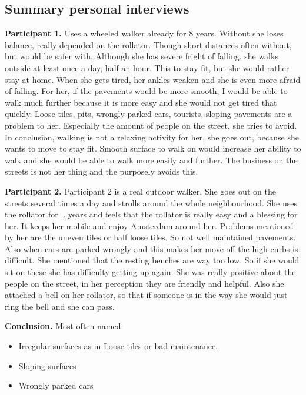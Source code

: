 



\subsection{Summary personal interviews}

\textbf{Participant 1.}
Uses a wheeled walker already for 8 years. Without she loses balance, really depended on the rollator. Though short distances often without, but would be safer with. Although she has severe fright of falling, she walks outside at least once a day, half an hour. This to stay fit, but she would rather stay at home. When she gets tired, her ankles weaken and she is even more afraid of falling. 
For her, if the pavements would be more smooth, I would be able to walk much further because it is more easy and she would not get tired that quickly. Loose tiles, pits, wrongly parked cars, tourists, sloping pavements are a problem to her. Especially the amount of people on the street, she tries to avoid. 
In conclusion, walking is not a relaxing activity for her, she goes out, because she wants to move to stay fit. Smooth surface to walk on would increase her ability to walk and she would be able to walk more easily and further. The business on the streets is not her thing and the purposely avoids this. 

\textbf{Participant 2. }
Participant 2 is a real outdoor walker. She goes out on the streets several times a day and strolls around the whole neighbourhood. She uses the rollator for .. years and feels that the rollator is really easy and a blessing for her. It keeps her mobile and enjoy Amsterdam around her. 
Problems mentioned by her are the uneven tiles or half loose tiles. So not well maintained pavements. Also when cars are parked wrongly and this makes her move off the high curbs is difficult. 
She mentioned that the resting benches are way too low. So if she would sit on these she has difficulty getting up again. 
She was really positive about the people on the street, in her perception they are friendly and helpful. Also she attached a bell on her rollator, so that if someone is in the way she would just ring the bell and she can pass. 

\textbf{Conclusion.} Most often named: 
\begin{itemize}
\item Irregular surfaces as in Loose tiles or bad maintenance. 
\item Sloping surfaces
\item Wrongly parked cars
\end{itemize}


